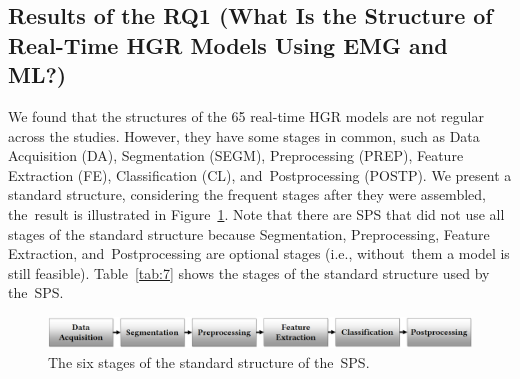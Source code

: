 \documentclass[sensors,review,accept,moreauthors,pdftex]{Definitions/mdpi}
\begin{document}
\subsection{Results of the RQ1 (What Is the Structure of Real-Time HGR Models Using EMG and ML?)} \label{RQ1}

We found that the structures of the 65 real-time HGR models are not regular across the studies. However, they have some stages in common, such as Data Acquisition (DA), Segmentation (SEGM), Preprocessing (PREP), Feature Extraction (FE), Classification (CL), and~Postprocessing (POSTP). We present a standard structure, considering the frequent stages after they were assembled, the~result is illustrated in Figure~\ref{fig:3}. Note that there are SPS that did not use all stages of the standard structure because Segmentation, Preprocessing, Feature Extraction, and~Postprocessing are optional stages (i.e., without~them a model is still feasible). Table~\ref{tab:7} shows the stages of the standard structure used by the~SPS.


\begin{figure}[H]
	\centering
	\includegraphics[width=\linewidth]{commonStructure}
	\caption{The six stages of the standard structure of the~SPS.}
	\label{fig:3}

\end{figure}
\end{document}
